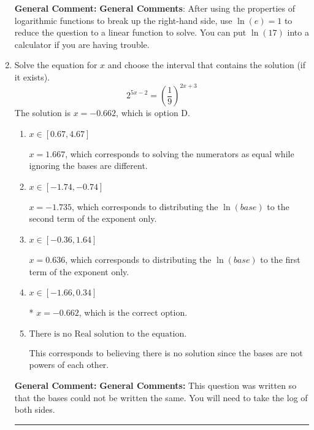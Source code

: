 \documentclass{extbook}[14pt]
\newcommand{\litem}[1]{\item #1

\rule{\textwidth}{0.4pt}}
\begin{document}
\begin{enumerate}
{\textbf{General Comment:} \textbf{General Comments}: After using the properties of logarithmic functions to break up the right-hand side, use $\ln(e) = 1$ to reduce the question to a linear function to solve. You can put $\ln(17)$ into a calculator if you are having trouble.
}
\litem{
Solve the equation for $x$ and choose the interval that contains the solution (if it exists).
\[ 2^{5x-2} = \left(\frac{1}{9}\right)^{2x+3} \]The solution is \( x = -0.662 \), which is option D.\begin{enumerate}[label=\Alph*.]
\item \( x \in [0.67, 4.67] \)

$x = 1.667$, which corresponds to solving the numerators as equal while ignoring the bases are different.
\item \( x \in [-1.74, -0.74] \)

$x = -1.735$, which corresponds to distributing the $\ln(base)$ to the second term of the exponent only.
\item \( x \in [-0.36, 1.64] \)

$x = 0.636$, which corresponds to distributing the $\ln(base)$ to the first term of the exponent only.
\item \( x \in [-1.66, 0.34] \)

* $x = -0.662$, which is the correct option.
\item \( \text{There is no Real solution to the equation.} \)

This corresponds to believing there is no solution since the bases are not powers of each other.
\end{enumerate}

\textbf{General Comment:} \textbf{General Comments:} This question was written so that the bases could not be written the same. You will need to take the log of both sides.
}
\end{enumerate}
\end{document}
